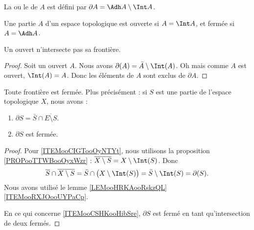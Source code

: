 \begin{definition}      \label{DEFooACVLooRwehTl}
	La  ou le  de \( A\) est défini par \( \partial A = \Adh A \setminus \Int A\).
\end{definition}

\begin{lemma}       \label{LEMooMPZWooGrqYIX}
	Une partie \( A\) d'un espace topologique est ouverte si \( A = \Int A\), et fermée si \( A = \Adh A\).
\end{lemma}

\begin{proposition}	\label{PROPooFHURooGXcekV}
	Un ouvert n'intersecte pas sa frontière.
\end{proposition}

\begin{proof}
	Soit un ouvert \( A\). Nous avons \( \partial(A)=\bar A\setminus\Int(A)\). Oh mais comme \( A\) est ouvert, \(  \Int(A)=A\). Donc les éléments de \( A\) sont exclus de \( \partial A\).
\end{proof}

\begin{proposition}	\label{PROPooTHOPooCOGmZD}
	Toute frontière est fermée. Plus précisément : si \( S\) est une partie de l'espace topologique \( X\), nous avons :
	\begin{enumerate}
		\item		\label{ITEMooCIGTooOyNTYt}
		      \( \partial S=\bar S\cap \overline{E\setminus S}\).
		\item		\label{ITEMooCSHKooHibSre}
		      \( \partial S\) est fermée.
	\end{enumerate}
\end{proposition}

\begin{proof}
	Pour \ref{ITEMooCIGTooOyNTYt}, nous utilisons la proposition \ref{PROPooTTWBooOyxWzr} : \( \overline{X\setminus S}=X\setminus\Int(S)\). Donc
	\begin{equation}
		\overline{S}\cap\overline{X\setminus S}=\bar S\cap\big( X\setminus \Int(S) \big)=\bar S\setminus \Int(S)=\partial(S).
	\end{equation}
	Nous avons utilisé le lemme \ref{LEMooHRKAooRskzQL}\ref{ITEMooRXJOooUYPaCp}.

	En ce qui concerne \ref{ITEMooCSHKooHibSre}, \( \partial S\) est fermé en tant qu'intersection de deux fermés.
\end{proof}

